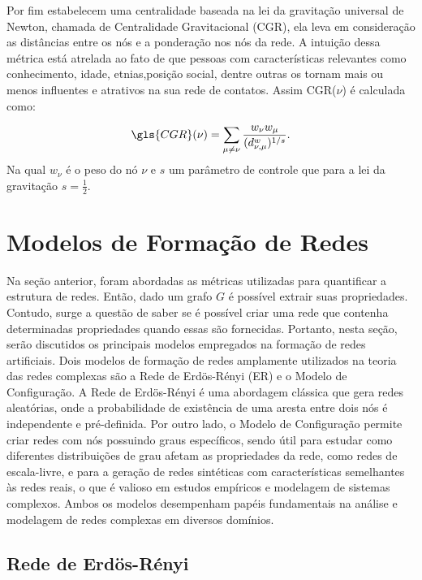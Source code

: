 Por fim
 estabelecem uma centralidade baseada na lei da gravitação universal de Newton, chamada de Centralidade Gravitacional (\gls{CGR}), ela leva em consideração as distâncias entre os nós e a ponderação nos nós da rede. A intuição dessa métrica está atrelada ao fato de que pessoas com características relevantes como conhecimento, idade, etnias,posição social, dentre outras os tornam mais ou menos influentes e atrativos na sua rede de contatos. Assim \gls{CGR}($\nu$) é calculada como:

\begin{equation}
  \gls{CGR}(\nu) =\sum_{\mu \neq \nu}\frac{w_\nu w_\mu}{(d_{\nu,\mu}^w)^{1/s}}.
\end{equation}
Na qual $w_\nu$ é o peso do nó $\nu$ e $s$ um parâmetro de controle que para a lei da gravitação $s = \frac{1}{2}$.

\section{Modelos de Formação de Redes}

Na seção anterior, foram abordadas as métricas utilizadas para quantificar a estrutura de redes. Então, dado um grafo $G$ é possível extrair suas propriedades. Contudo, surge a questão de saber se é possível criar uma rede que contenha determinadas propriedades quando essas são fornecidas. Portanto, nesta seção, serão discutidos os principais modelos empregados na formação de redes artificiais. Dois modelos de formação de redes amplamente utilizados na teoria das redes complexas são a Rede de Erdös-Rényi (ER) e o Modelo de Configuração. A Rede de Erdös-Rényi é uma abordagem clássica que gera redes aleatórias, onde a probabilidade de existência de uma aresta entre dois nós é independente e pré-definida. Por outro lado, o Modelo de Configuração permite criar redes com nós possuindo graus específicos, sendo útil para estudar como diferentes distribuições de grau afetam as propriedades da rede, como redes de escala-livre, e para a geração de redes sintéticas com características semelhantes às redes reais, o que é valioso em estudos empíricos e modelagem de sistemas complexos. Ambos os modelos desempenham papéis fundamentais na análise e modelagem de redes complexas em diversos domínios.

\subsection{Rede de Erdös-Rényi}

